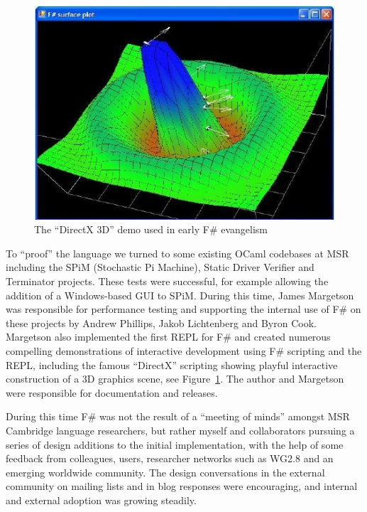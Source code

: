 \documentclass[acmsmall]{acmart}\settopmatter{}
\begin{document}
\begin{figure}
  \begin{center}
  \includegraphics[width=0.9\linewidth]{directx2.jpg}
  \end{center}
  \caption{The ``DirectX 3D'' demo used in early F\# evangelism}
  \label{fig:directx}
\end{figure}

To “proof” the language we turned to some existing OCaml codebases at MSR including the SPiM (Stochastic Pi Machine), Static Driver Verifier
and Terminator projects.  These tests were successful, for example allowing the addition of a Windows-based GUI to SPiM.   During this time,
James Margetson was responsible for performance testing and supporting the internal use of F\# on these projects by Andrew Phillips, Jakob
Lichtenberg and Byron Cook. Margetson also implemented the first REPL for F\# and created numerous compelling demonstrations of interactive
development using F\# scripting and the REPL, including the famous ``DirectX'' scripting showing playful interactive construction of a 3D graphics scene, see
Figure~\ref{fig:directx}.
The author and Margetson were responsible for documentation and releases.

During this time F\# was not the result of a “meeting of minds” amongst MSR Cambridge language researchers, but rather myself and collaborators
pursuing a series of design additions to the initial implementation, with the help of some feedback from colleagues, users, researcher networks
such as WG2.8 and an emerging worldwide community.  The design conversations in the external community on mailing lists and in blog responses
were encouraging, and internal and external adoption was growing steadily. 
\end{document}
